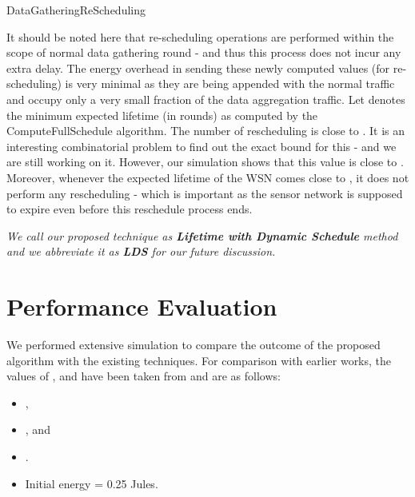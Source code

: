 \documentclass[10pt]{llncs}
\begin{document}
\begin{algorithm}[htb]
\begin{algorithmic}
		\ENDIF
	\ENDIF
	\ELSE {}
	\ENDIF
\ENDFOR
\STATE{}
\ENDIF
{}
\ENDIF
\end{algorithmic}
\caption{DataGatheringReScheduling} \label{algo:DataGatheringReScheduling}
\end{algorithm}

It should be noted here that re-scheduling operations are performed within the scope of normal data gathering round - and thus this process does not incur any extra delay. The energy overhead in sending these newly computed values (for re-scheduling) is very minimal as they are being appended with the normal traffic and occupy only a very small fraction of the data aggregation traffic. Let  denotes the minimum expected lifetime (in rounds) as computed by the ComputeFullSchedule algorithm. The number of rescheduling is close to . It is an interesting combinatorial problem to find out the exact bound for this - and we are still working on it. However, our simulation shows that this value is close to . Moreover, whenever the expected lifetime of the WSN comes close to , it does not perform any rescheduling - which is important as the sensor network is supposed to expire even before this reschedule process ends.

{\it We call our proposed technique as {\bf Lifetime with Dynamic Schedule} method and we abbreviate it as {\bf LDS} for our future discussion.}



\section{Performance Evaluation}

We performed extensive simulation to compare the outcome of the proposed algorithm with the existing techniques. For comparison with earlier works, the values of ,  and  have been taken from \cite{Lindsey01} and are as follows:
\begin{itemize}
\item[]  ,
\item[]  , and
\item[] .
\item[] Initial energy = 0.25 Jules.
\end{itemize}
\end{document}
